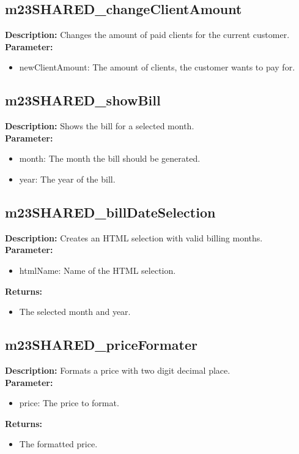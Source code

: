 \subsection{m23SHARED\_changeClientAmount}
\textbf{Description:} Changes the amount of paid clients for the current customer.\\
\textbf{Parameter:}
\begin{itemize}
\item newClientAmount: The amount of clients, the customer wants to pay for.
\end{itemize}

\subsection{m23SHARED\_showBill}
\textbf{Description:} Shows the bill for a selected month.\\
\textbf{Parameter:}
\begin{itemize}
\item month: The month the bill should be generated.
\item year: The year of the bill.
\end{itemize}

\subsection{m23SHARED\_billDateSelection}
\textbf{Description:} Creates an HTML selection with valid billing months.\\
\textbf{Parameter:}
\begin{itemize}
\item htmlName: Name of the HTML selection.
\end{itemize}
\textbf{Returns:}
\begin{itemize}
\item The selected month and year.
\end{itemize}

\subsection{m23SHARED\_priceFormater}
\textbf{Description:} Formats a price with two digit decimal place.\\
\textbf{Parameter:}
\begin{itemize}
\item price: The price to format.
\end{itemize}
\textbf{Returns:}
\begin{itemize}
\item The formatted price.
\end{itemize}

